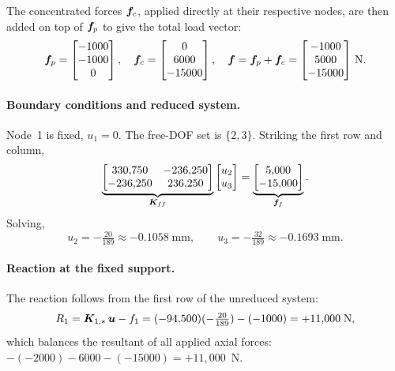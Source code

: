 \begin{example}
The concentrated forces $\bm{f}_c$, applied directly at their respective
nodes, are then added on top of $\bm{f}_p$ to give the total load
vector:
\[
   \bm{f}_p = \begin{bmatrix} -1000 \\ -1000 \\ 0 \end{bmatrix},\quad
   \bm{f}_c = \begin{bmatrix} 0 \\ 6000 \\ -15000 \end{bmatrix},\quad
   \bm{f} = \bm{f}_p + \bm{f}_c
            = \begin{bmatrix} -1000 \\ 5000 \\ -15000 \end{bmatrix}\,\text{N} .
\]

\paragraph{Boundary conditions and reduced system.}
Node~1 is fixed, $u_1 = 0$. The free-DOF set is $\{2,3\}$. Striking the first
row and column,
\[
   \underbrace{\begin{bmatrix} 330{,}750 & -236{,}250 \\ -236{,}250 & 236{,}250 \end{bmatrix}}_{\bm{K}_{ff}}
   \begin{bmatrix} u_2 \\ u_3 \end{bmatrix}
   =
   \underbrace{\begin{bmatrix} 5{,}000 \\ -15{,}000 \end{bmatrix}}_{\bm{f}_f} .
\]
Solving,
\[
   u_2 = -\tfrac{20}{189} \approx -0.1058 \;\text{mm},
   \qquad
   u_3 = -\tfrac{32}{189} \approx -0.1693 \;\text{mm}.
\]

\paragraph{Reaction at the fixed support.}
The reaction follows from the first row of the unreduced system:
\[
   R_1 = \bm{K}_{1,*}\,\bm{u} - f_1
       = (-94{,}500)(-\tfrac{20}{189}) - (-1000) = +11{,}000 \;\text{N},
\]
which balances the resultant of all applied axial forces:
$-(-2000) - 6000 - (-15000) = +11{,}000$~N.


\end{example}
